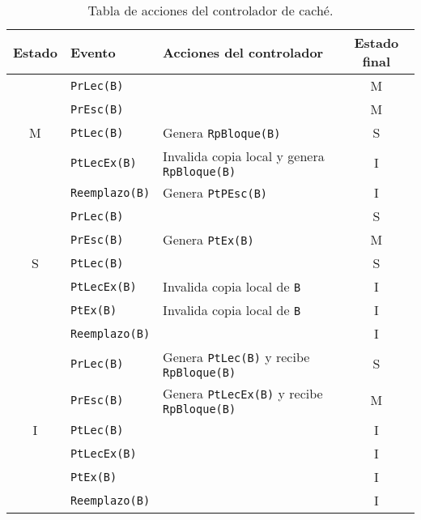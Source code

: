 \begin{table}
\centering
\begin{tabular}{c l l c}
    \toprule
    Estado & Evento & Acciones del controlador & Estado final \\
    \toprule
           & \verb|PrLec(B)| & & M \\
    \midrule
    & \verb|PrEsc(B)| & & M \\
    \midrule
    M & \verb|PtLec(B)| & Genera \verb|RpBloque(B)| & S \\
    \midrule
      & \verb|PtLecEx(B)| & Invalida copia local y genera \verb|RpBloque(B)| & I \\
    \midrule
      & \verb|Reemplazo(B)| & Genera \verb|PtPEsc(B)| & I \\
    \bottomrule
      & \verb|PrLec(B)| & & S \\
    \midrule
      & \verb|PrEsc(B)| & Genera \verb|PtEx(B)| & M \\
    \midrule
    S & \verb|PtLec(B)| & & S \\
    \midrule
      & \verb|PtLecEx(B)| & Invalida copia local de \verb|B| & I \\
    \midrule
      & \verb|PtEx(B)| & Invalida copia local de \verb|B| & I \\
    \midrule
      & \verb|Reemplazo(B)| &  & I \\
    \toprule
      & \verb|PrLec(B)| & Genera \verb|PtLec(B)| y recibe \verb|RpBloque(B)| & S \\
    \midrule
      & \verb|PrEsc(B)| & Genera \verb|PtLecEx(B)| y recibe \verb|RpBloque(B)|& M \\
    \midrule
    I & \verb|PtLec(B)| & & I \\
    \midrule
      & \verb|PtLecEx(B)| & & I \\
    \midrule
      & \verb|PtEx(B)| & & I \\
    \midrule
      & \verb|Reemplazo(B)| &   & I \\
    \bottomrule
\end{tabular}
\caption{Tabla de acciones del controlador de caché.}
\label{tab:acciones_controlador_MSI}
\end{table}

